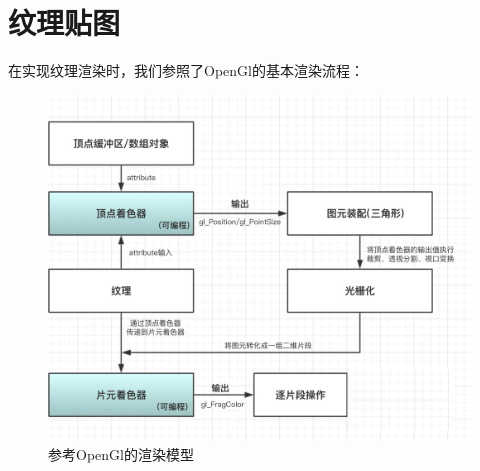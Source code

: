     \section{纹理贴图}
        \begin{spacing}{2.5}
        	在实现纹理渲染时，我们参照了OpenGl的基本渲染流程：
      \begin{figure}[H]
    	\centering
		\includegraphics[width=1.0\textwidth]{images/gl_texture.jpg}
		\caption{参考OpenGl的渲染模型}
		\label{gl_texture}
    \end{figure}
    

\end{spacing}

